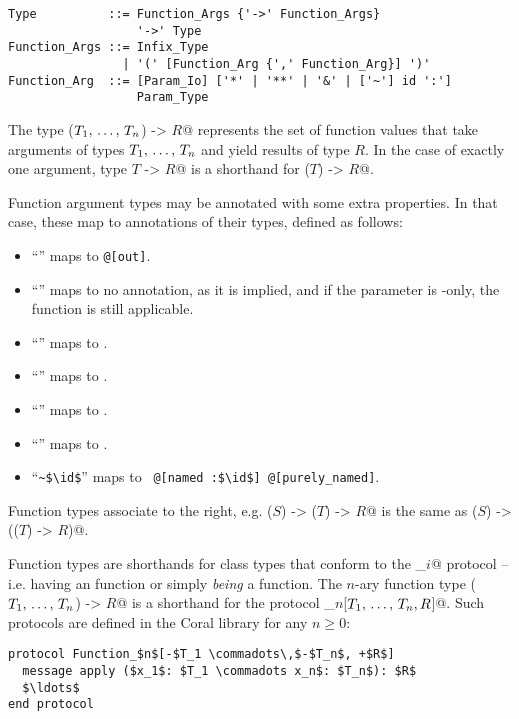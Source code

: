 \syntax\begin{lstlisting}
Type          ::= Function_Args {'->' Function_Args}
                  '->' Type
Function_Args ::= Infix_Type
                | '(' [Function_Arg {',' Function_Arg}] ')'
Function_Arg  ::= [Param_Io] ['*' | '**' | '&' | ['~'] id ':']
                  Param_Type
\end{lstlisting}

The type \lstinline@($T_1 ,\, \ldots ,\, T_n$) -> $R$@ represents the set of function values that take arguments of types $T_1 ,\, \ldots ,\, T_n$ and yield results of type $R$. In the case of exactly one argument, type \lstinline@$T$ -> $R$@ is a shorthand for \lstinline@($T$) -> $R$@. 

Function argument types may be annotated with some extra properties. In that case, these map to annotations of their types, defined as follows:
\begin{itemize}
\item ``'' maps to \lstinline[deletekeywords={out}]!@[out]!. 
\item ``'' maps to no annotation, as it is implied, and if the parameter is -only, the function is still applicable. 
\item ``\code{*}'' maps to . 
\item ``\code{**}'' maps to . 
\item ``\code{&}'' maps to . 
\item ``\code{$\id$}'' maps to . 
\item ``\lstinline!~$\id$!'' maps to ~\lstinline!@[named :$\id$] @[purely_named]!. 
\end{itemize}

Function types associate to the right, e.g. \lstinline@($S$) -> ($T$) -> $R$@ is the same as \lstinline@($S$) -> (($T$) -> $R$)@. 

Function types are shorthands for class types that conform to the \lstinline@Function_$i$@ protocol -- i.e. having an  function or simply {\em being} a function. The $n$-ary function type \lstinline@($T_1 ,\, \ldots ,\, T_n$) -> $R$@ is a shorthand for the protocol \lstinline@Function_$n$[$T_1 ,\, \ldots ,\, T_n,R$]@. Such protocols are defined in the Coral library for any $n \ge 0$:

\begin{lstlisting}
protocol Function_$n$[-$T_1 \commadots\,$-$T_n$, +$R$]
  message apply ($x_1$: $T_1 \commadots x_n$: $T_n$): $R$
  $\ldots$
end protocol
\end{lstlisting}

